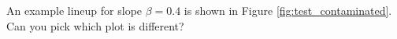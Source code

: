 \documentclass[12pt]{article}
\begin{document}

An example lineup for slope $\beta=0.4$ is shown in Figure \ref{fig:test_contaminated}.  Can you pick which plot is different? %

\end{document}
